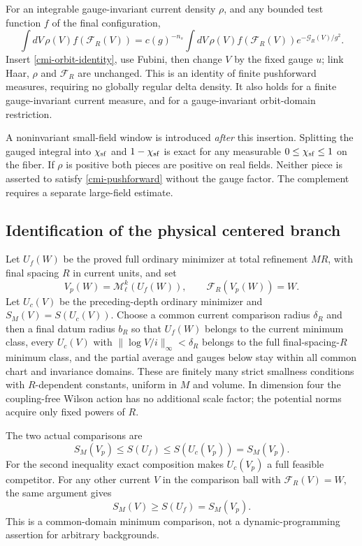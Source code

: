 For an integrable gauge-invariant current density $\rho$, and
any bounded test function $f$ of the final configuration,
\begin{equation}\label{cmi-pushforward}
 \int dV\,\rho(V)f(\mathcal F_R(V))
 =c(g)^{-n_s}\int dV\,\rho(V)f(\mathcal F_R(V))
                            e^{-\mathcal G_R(V)/g^2}.
\end{equation}
Insert \eqref{cmi-orbit-identity}, use Fubini, then change
$V$ by the fixed gauge $u$; link Haar, $\rho$ and $\mathcal F_R$
are unchanged. This is an identity of finite pushforward
measures, requiring no globally regular delta density.
It also holds for a finite gauge-invariant current measure,
and for a gauge-invariant orbit-domain restriction.

A noninvariant small-field window is introduced \emph{after}
this insertion. Splitting the gauged integral into $\chi_{\rm sf}$
and $1-\chi_{\rm sf}$ is exact for any measurable
$0\le\chi_{\rm sf}\le1$ on the fiber. If $\rho$ is positive
both pieces are positive on real fields. Neither piece is
asserted to satisfy \eqref{cmi-pushforward} without the gauge
factor. The complement requires a separate large-field estimate.

\subsection{Identification of the physical centered branch}
\label{cmi-branch-section}

Let $U_f(W)$ be the proved full ordinary minimizer at total
refinement $MR$, with final spacing $R$ in current units, and set
\begin{equation}\label{cmi-pregauge}
 V_p(W)=\mathcal M_\ell^k(U_f(W)),\qquad
 \mathcal F_R(V_p(W))=W.
\end{equation}
Let $U_c(V)$ be the preceding-depth ordinary minimizer and
$S_M(V)=S(U_c(V))$. Choose a common current comparison radius
$\delta_R$ and then a final datum radius $b_R$ so that
$U_f(W)$ belongs to the current minimum class, every $U_c(V)$
with $\|\log V/i\|_\infty<\delta_R$ belongs to the full
final-spacing-$R$ minimum class, and the partial average and
gauges below stay within all common chart and invariance domains.
These are finitely many strict smallness conditions with
$R$-dependent constants, uniform in $M$ and volume. In dimension
four the coupling-free Wilson action has no additional scale
factor; the potential norms acquire only fixed powers of $R$.

The two actual comparisons are
\begin{equation}\label{cmi-two-comparisons}
 S_M(V_p)\le S(U_f)
       \le S(U_c(V_p))=S_M(V_p).
\end{equation}
For the second inequality exact composition makes $U_c(V_p)$
a full feasible competitor. For any other current $V$ in the
comparison ball with $\mathcal F_R(V)=W$, the same argument gives
\begin{equation}\label{cmi-current-minimum}
 S_M(V)\ge S(U_f)=S_M(V_p).
\end{equation}
This is a common-domain minimum comparison, not a
dynamic-programming assertion for arbitrary backgrounds.

